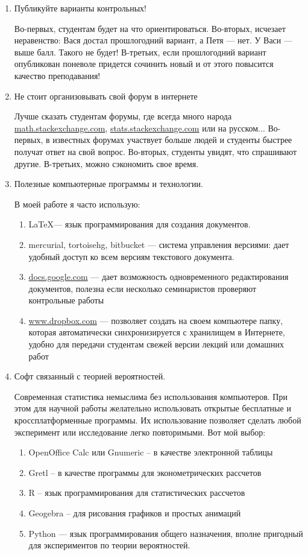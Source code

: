 \documentclass[pdftex,12pt,a4paper]{article}
\begin{document}
\begin{enumerate}
\item Публикуйте варианты контрольных!

Во-первых, студентам будет на что ориентироваться. Во-вторых, исчезает неравенство: Вася достал прошлогодний вариант, а Петя --- нет. У Васи --- выше балл. Такого не будет! В-третьих, если прошлогодний вариант опубликован поневоле придется сочинить новый и от этого повысится качество преподавания!


\item Не стоит организовывать свой форум в интернете

Лучше сказать студентам форумы, где всегда много народа
\url{math.stackexchange.com}, \url{stats.stackexchange.com} или на русском...
Во-первых, в известных форумах участвует больше людей и студенты быстрее получат ответ на свой вопрос. Во-вторых, студенты увидят, что спрашивают другие. В-третьих, можно сэкономить свое время.


\item Полезные компьютерные программы и технологии.

В моей работе я часто использую:
\begin{enumerate}
\item \LaTeX --- язык программирования для создания документов. 
\item mercurial, tortoisehg, bitbucket --- система управления версиями: дает удобный доступ ко всем версиям текстового документа. 
\item \url{docs.google.com} --- дает возможность одновременного редактирования документов, полезна если несколько семинаристов проверяют контрольные работы
\item \url{www.dropbox.com} --- позволяет создать на своем компьютере папку, которая автоматически синхронизируется с хранилищем в Интернете, удобно для передачи студентам свежей версии лекций или домашних работ
\end{enumerate}

\item Софт связанный с теорией вероятностей.

Современная статистика немыслима без использования компьютеров. При этом для научной работы желательно использовать открытые бесплатные и кроссплатформенные программы. Их использование позволяет сделать любой эксперимент или исследование легко повторимыми. Вот мой выбор:
\begin{enumerate}
\item OpenOffice Calc или Gnumeric – в качестве электронной таблицы
\item Gretl – в качестве программы для эконометрических рассчетов
\item R – язык программирования для статистических рассчетов
\item Geogebra – для рисования графиков и простых анимаций
\item Python --- язык программирования общего назначения, вполне пригодный для экспериментов по теории вероятностей.
\end{enumerate}


\end{enumerate}
\end{document}
